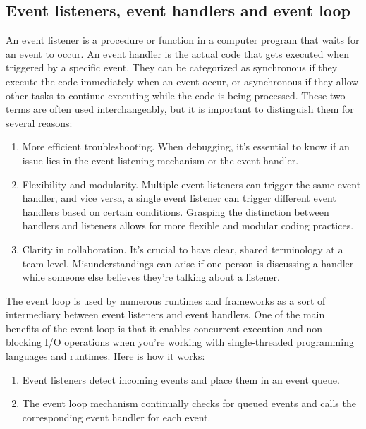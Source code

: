 \documentclass[twocolumn]{article}
\begin{document}
\subsection{Event listeners, event handlers and event loop}

An event listener is a procedure or function in a computer program that waits for an event to occur.  
An event handler is the actual code that gets executed when triggered by a specific event. They can be categorized as synchronous if they execute the code immediately when an event occur, or asynchronous if they allow other tasks to continue executing while the code is being processed. \cite{studysmarterEventDriven}
These two terms are often used interchangeably, but it is important to distinguish them for several reasons:

\begin{enumerate}
     \item More efficient troubleshooting. When debugging, it's essential to know if an issue lies in the event listening mechanism or the event handler.
     \item Flexibility and modularity. Multiple event listeners can trigger the same event handler, and vice versa, a single event listener can trigger different event handlers based on certain conditions. Grasping the distinction between handlers and listeners allows for more flexible and modular coding practices.
     \item Clarity in collaboration. It’s crucial to have clear, shared terminology at a team level. Misunderstandings can arise if one person is discussing a handler while someone else believes they’re talking about a listener.
\end{enumerate}

The event loop is used by numerous runtimes and frameworks as a sort of intermediary between event listeners and event handlers.  
One of the main benefits of the event loop is that it enables concurrent execution and non-blocking I/O operations when you’re working with single-threaded programming languages and runtimes.  
Here is how it works:

\begin{enumerate}
     \item Event listeners detect incoming events and place them in an event queue.
     \item The event loop mechanism continually checks for queued events and calls the corresponding event handler for each event. \cite{quixWhatEventdriven}
\end{enumerate}
\end{document}
